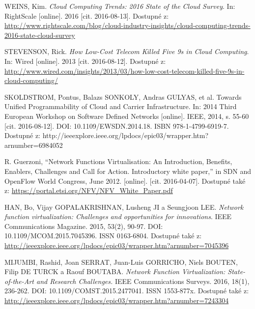 
 \renewcommand{\appendixname}{Literatura}%

  
\begin{thebibliography}{10}

WEINS, Kim. \emph{Cloud Computing Trends: 2016 State of the Cloud Survey}. In: RightScale [online]. 2016 [cit. 2016-08-13]. Dostupné z: \url{http://www.rightscale.com/blog/cloud-industry-insights/cloud-computing-trends-2016-state-cloud-survey}

STEVENSON, Rick. \emph{How Low-Cost Telecom Killed Five 9s in Cloud Computing}. In: Wired [online]. 2013 [cit. 2016-08-12]. Dostupné z: \url{http://www.wired.com/insights/2013/03/how-low-cost-telecom-killed-five-9s-in-cloud-computing/}

SKOLDSTROM, Pontus, Balazs SONKOLY, Andras GULYAS, et al. Towards Unified Programmability of Cloud and Carrier Infrastructure. In: 2014 Third European Workshop on Software Defined Networks [online]. IEEE, 2014, s. 55-60 [cit. 2016-08-12]. DOI: 10.1109/EWSDN.2014.18. ISBN 978-1-4799-6919-7. Dostupné z: http://ieeexplore.ieee.org/lpdocs/epic03/wrapper.htm?arnumber=6984052

R. Guerzoni, “Network Functions Virtualisation: An Introduction, Benefits, Enablers, Challenges and Call for Action. Introductory white paper,” in SDN and OpenFlow World Congress, June 2012. [online]. [cit. 2016-04-07]. Dostupné také z: \url{https://portal.etsi.org/NFV/NFV_White_Paper.pdf}

HAN, Bo, Vijay GOPALAKRISHNAN, Lusheng JI a Seungjoon LEE. \emph{Network function virtualization: Challenges and opportunities for innovations}. IEEE Communications Magazine. 2015, 53(2), 90-97. DOI: 10.1109/MCOM.2015.7045396. ISSN 0163-6804. Dostupné také z: \url{http://ieeexplore.ieee.org/lpdocs/epic03/wrapper.htm?arnumber=7045396}

MIJUMBI, Rashid, Joan SERRAT, Juan-Luis GORRICHO, Niels BOUTEN, Filip DE TURCK a Raouf BOUTABA. \emph{Network Function Virtualization: State-of-the-Art and Research Challenges.} IEEE Communications Surveys. 2016, 18(1), 236-262. DOI: 10.1109/COMST.2015.2477041. ISSN 1553-877x. Dostupné také z: \url{http://ieeexplore.ieee.org/lpdocs/epic03/wrapper.htm?arnumber=7243304}


\end{thebibliography}
